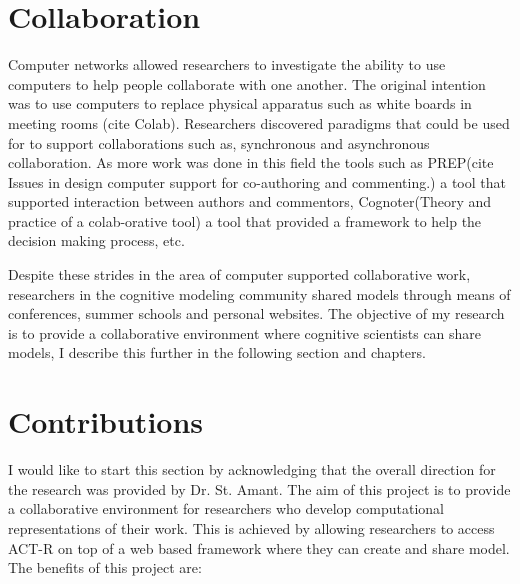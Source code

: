 \section {Collaboration}
Computer networks allowed researchers
to investigate the ability to use computers to help people collaborate
with one another. The original intention was to use computers to replace
physical apparatus such as white boards in meeting rooms (cite Colab). 
Researchers discovered paradigms that could be used for to support
collaborations such as, synchronous and asynchronous collaboration. As
more work was done in this field the tools such as PREP(cite Issues in
design computer support for co-authoring and commenting.) a tool that
supported interaction between authors and commentors,
Cognoter(Theory and practice of a colab-orative tool) a tool that
provided a framework to help the decision making process, etc.

Despite these strides in the area of computer supported collaborative
work, researchers in the cognitive modeling community 
shared models through means of conferences, summer schools and
personal websites. The objective of my research is to provide a
collaborative environment where cognitive scientists can share
models, I describe this further in the following section and chapters.

\section{Contributions}

I would like to start this section by acknowledging that the overall
direction for the research was provided by 
Dr. St. Amant. The aim of this project is to provide a collaborative
environment for researchers who develop computational representations
of their work. This is achieved by allowing researchers to access
ACT-R on top of a web based framework where they can create 
and share model. The benefits of this project are:


